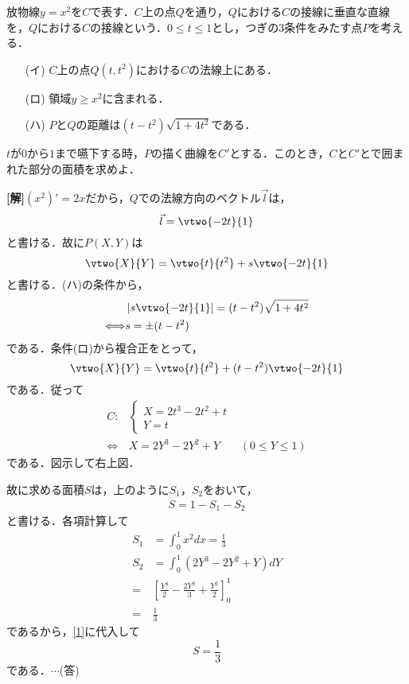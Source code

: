 \documentclass[a4j]{jarticle}
\begin{document}

     \begin{oframed}
     放物線$y=x^2$を$C$で表す．$C$上の点$Q$を通り，$Q$における$C$の接線に垂直な直線
     を，$Q$における$C$の接線という．$0\le t\le1$とし，つぎの$3$条件をみたす点$P$を考える．
          \begin{itemize}
          \item[(イ)] $C$上の点$Q(t,t^2)$における$C$の法線上にある．
          \item[(ロ)] 領域$y\ge x^2$に含まれる．
          \item[(ハ)] $P$と$Q$の距離は$(t-t^2)\sqrt{1+4t^2}$である．
          \end{itemize}
     $t$が$0$から$1$まで嚥下する時，$P$の描く曲線を$C'$とする．このとき，$C$と$C'$とで囲ま
     れた部分の面積を求めよ．
     \end{oframed}

\setlength{\columnseprule}{0.4pt}
\begin{multicols}{2}
{\bf[解]}$(x^2)'=2x$だから，$Q$での法線方向のベクトル$\vec{l}$は，
     \[\vec{l}=\vtwo{-2t}{1}\]
と書ける．故に$P(X,Y)$は
     \[\vtwo{X}{Y}=\vtwo{t}{t^2}+s\vtwo{-2t}{1}\]
と書ける．(ハ)の条件から，
     \begin{align*}
     &\left|s\vtwo{-2t}{1}\right|=(t-t^2)\sqrt{1+4t^2} \\
     \Longleftrightarrow &s=\pm(t-t^2)
     \end{align*}
である．条件(ロ)から複合正をとって，
      \[\vtwo{X}{Y}=\vtwo{t}{t^2}+(t-t^2)\vtwo{-2t}{1}\]
である．従って
     \begin{align*}
     C: 
          &\begin{cases}
          X=2t^3-2t^2+t \\
          Y=t
          \end{cases} \\
     \Longleftrightarrow
     &X=2Y^3-2Y^2+Y&(0\le Y\le 1)
     \end{align*}
である．図示して右上図．
     \begin{center}
     \scalebox{.7}{}
     \end{center}


故に求める面積$S$は，上のように$S_1$，$S_2$をおいて，
     \begin{align}
     S=1-S_1-S_2\label{1}
     \end{align}
と書ける．各項計算して
     \begin{align*}
     S_1&=\int_0^1x^2dx=\frac{1}{3} \\
     S_2&=\int_0^1(2Y^3-2Y^2+Y)dY \\
     =&\left[\frac{Y^4}{2}-\frac{2Y^3}{3}+\frac{Y^2}{2}\right]_0^1 \\
     =&\frac{1}{3}
     \end{align*}
であるから，\eqref{1}に代入して
     \[S=\frac{1}{3}\]
である．$\cdots$(答)
     
\newpage
\end{multicols}
\end{document}
